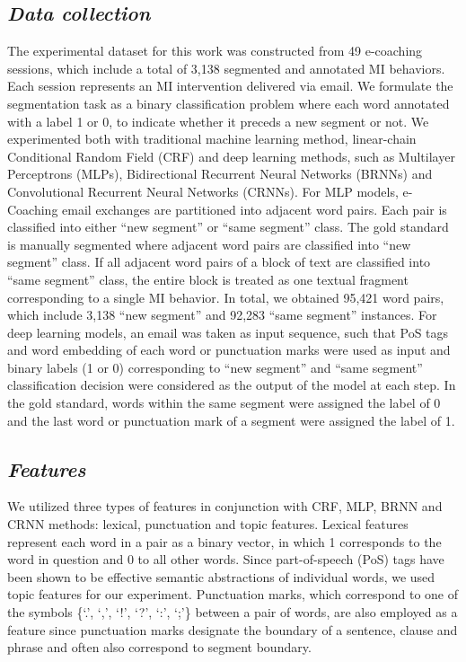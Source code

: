 \documentclass{amia}
\begin{document}
\subsection*{\textit{Data collection}}
The experimental dataset for this work was constructed from 49 e-coaching sessions, which include a total of 3,138 segmented and annotated MI behaviors. Each session represents an MI intervention delivered via email. We formulate the segmentation task as a binary classification problem where each word annotated with a label 1 or 0, to indicate whether it preceds a new segment or not. We experimented both with traditional machine learning method, linear-chain Conditional Random Field (CRF) and deep learning methods, such as Multilayer Perceptrons (MLPs), Bidirectional Recurrent Neural Networks (BRNNs) and Convolutional Recurrent Neural Networks (CRNNs). For MLP models, e-Coaching email exchanges are partitioned into adjacent word pairs. Each pair is classified into either ``new segment'' or ``same segment'' class. The gold standard is manually segmented where adjacent word pairs are classified into ``new segment'' class. If all adjacent word pairs of a block of text are classified into ``same segment'' class, the entire block is treated as one textual fragment corresponding to a single MI behavior. In total, we obtained 95,421 word pairs, which include 3,138 ``new segment'' and 92,283 ``same segment'' instances. For deep learning models, an email was taken as input sequence, such that PoS tags and word embedding of each word or punctuation marks were used as input and binary labels (1 or 0) corresponding to ``new segment'' and ``same segment'' classification decision were considered as the output of the model at each step. In the gold standard, words within the same segment were assigned the label of 0 and the last word or punctuation mark of a segment were assigned the label of 1.    

\subsection*{\textit{Features}}

We utilized three types of features in conjunction with CRF, MLP, BRNN and CRNN methods: lexical, punctuation and topic features. Lexical features represent each word in a pair as a binary vector, in which 1 corresponds to the word in question and 0 to all other words. Since part-of-speech (PoS) tags \cite{kotov2015interpretable,hashimoto2016topic,lu2016modeling} have been shown to be effective semantic abstractions of individual words, we used topic features for our experiment. Punctuation marks, which correspond to one of the symbols \{`.', `,', `!', `?', `:', `;'\} between a pair of words, are also employed as a feature since punctuation marks designate the boundary of a sentence, clause and phrase and often also correspond to segment boundary.   
\end{document}
